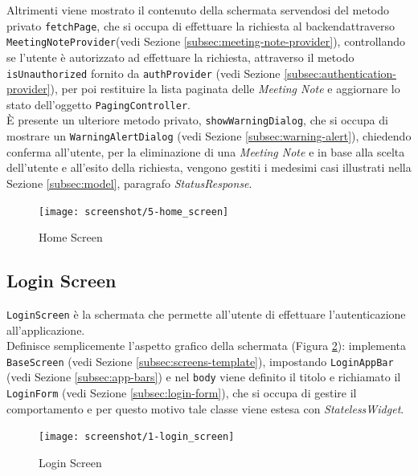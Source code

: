 Altrimenti viene mostrato il contenuto della schermata servendosi del metodo privato \lstinline{fetchPage}, che si occupa di effettuare la richiesta al \gls{backend}\glsoccur attraverso \lstinline{MeetingNoteProvider}(vedi Sezione \ref{subsec:meeting-note-provider}), controllando se l'utente è autorizzato ad effettuare la richiesta, attraverso il metodo \lstinline{isUnauthorized} fornito da \lstinline{authProvider} (vedi Sezione \ref{subsec:authentication-provider}), per poi restituire la lista paginata delle \emph{Meeting Note} e aggiornare lo stato dell'oggetto \lstinline{PagingController}. \\
È presente un ulteriore metodo privato, \lstinline{showWarningDialog}, che si occupa di mostrare un \lstinline{WarningAlertDialog} (vedi Sezione \ref{subsec:warning-alert}), chiedendo conferma all'utente, per la eliminazione di una \emph{Meeting Note} e in base alla scelta dell'utente e all'esito della richiesta, vengono gestiti i medesimi casi illustrati nella Sezione \ref{subsec:model}, paragrafo \emph{StatusResponse}.

\begin{figure}[!h] 
    \centering 
    \texttt{[image: screenshot/5-home\_screen]}
    \caption{Home Screen}
    \label{fig:home-screen}
\end{figure}

\newpage

\subsection{Login Screen}
\label{subsec:login-screen}

\lstinline{LoginScreen} è la schermata che permette all'utente di effettuare l'autenticazione all'applicazione. \\
Definisce semplicemente l'aspetto grafico della schermata (Figura \ref{fig:login-screen}): implementa \lstinline{BaseScreen} (vedi Sezione \ref{subsec:screens-template}), impostando \lstinline{LoginAppBar} (vedi Sezione \ref{subsec:app-bars}) e nel \lstinline{body} viene definito il titolo e richiamato il \lstinline{LoginForm} (vedi Sezione \ref{subsec:login-form}), che si occupa di gestire il comportamento e per questo motivo tale classe viene estesa con \emph{StatelessWidget}.

\begin{figure}[!h] 
    \centering 
    \texttt{[image: screenshot/1-login\_screen]} 
    \caption{Login Screen}
    \label{fig:login-screen}
\end{figure}

